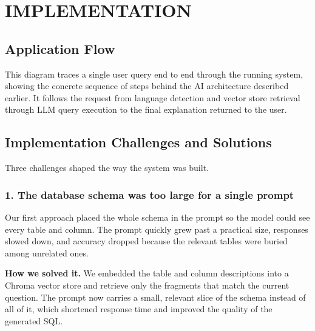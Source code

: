 \clearpage
\section{IMPLEMENTATION}
\label{sec:implementation}

\subsection{Application Flow}
\label{sub:application-flow}

This diagram traces a single user query end to end through the running
system, showing the concrete sequence of steps behind the AI
architecture described earlier. It follows the request from language
detection and vector store retrieval through LLM query execution to
the final explanation returned to the user.


\subsection{Implementation Challenges and Solutions}
\label{sub:implementation-challenges-and-solutions}

Three challenges shaped the way the system was built.

\subsubsection*{1. The database schema was too large for a single prompt}
Our first approach placed the whole schema in the prompt so the model
could see every table and column. The prompt quickly grew past a
practical size, responses slowed down, and accuracy dropped because the
relevant tables were buried among unrelated ones.

\noindent \textbf{How we solved it.} We embedded the table and column descriptions
into a Chroma vector store and retrieve only the fragments that match
the current question. The prompt now carries a small, relevant slice of
the schema instead of all of it, which shortened response time and
improved the quality of the generated SQL.

